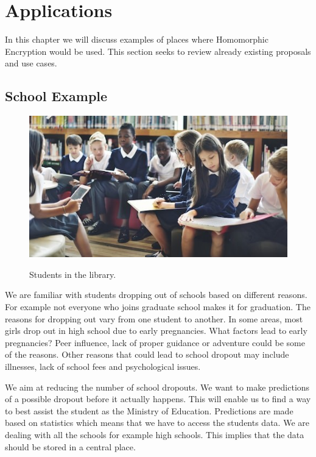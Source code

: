 \chapter{Applications}
In this chapter we will discuss examples of places where Homomorphic Encryption would be used. This section seeks to review already existing proposals and use cases.

\section{School Example}
\begin{figure}[!h]
\center
\includegraphics[scale=1]{images/school.jpg} 
\caption{Students in the library.}
\label{fig1: School Example}
\citep{archerapplications}

\end{figure}

We are familiar with students dropping out of schools based on different reasons. For example not everyone who joins graduate school makes it for graduation. The reasons for dropping out vary from one student to another. In some areas, most girls drop out in high school due to early pregnancies. What factors lead to early pregnancies? Peer influence, lack of proper guidance or adventure could be some of the reasons. Other reasons that could lead to school dropout may include illnesses, lack of school fees and psychological issues. 

We aim at reducing the number of school dropouts. We want to make predictions of a possible dropout before it actually happens. This will enable us to find a way to best assist the student as the Ministry of Education. Predictions are made based on statistics which means that we have to access the students data. We are dealing with all the schools for example high schools. This implies that the data should be stored in a central place. 

